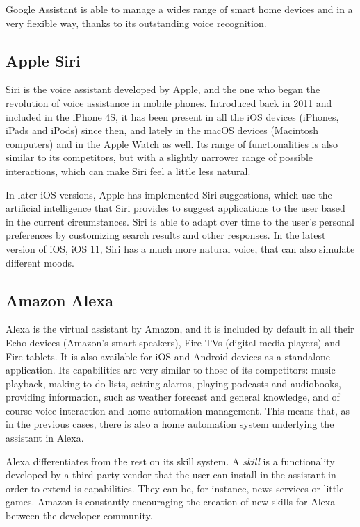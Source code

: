 Google Assistant is able to manage a wides range of smart home devices and in a very flexible way, thanks to its outstanding voice
recognition.

\subsection{Apple Siri}
Siri is the voice assistant developed by Apple, and the one who began the revolution of voice assistance in mobile phones. Introduced
back in 2011 and included in the iPhone 4S, it has been present in all the iOS devices (iPhones, iPads and iPods) since then, and lately
in the macOS devices (Macintosh computers) and in the Apple Watch as well.\cite{appleIOSSiri} Its range of functionalities is also
similar to its competitors, but with a slightly narrower range of possible interactions, which can make Siri feel a little less natural.

In later iOS versions, Apple has implemented Siri suggestions, which use the artificial intelligence that Siri provides to suggest
applications to the user based in the current circumstances. Siri is able to adapt over time to the user's personal preferences by
customizing search results and other responses. In the latest version of iOS, iOS 11, Siri has a much more natural voice, that can
also simulate different moods.

\subsection{Amazon Alexa}
Alexa is the virtual assistant by Amazon, and it is included by default in all their Echo devices (Amazon's smart speakers), Fire TVs
(digital media players) and Fire tablets. It is also available for iOS and Android devices as a standalone application. Its capabilities are
very similar to those of its competitors: music playback, making to-do lists, setting alarms, playing podcasts and audiobooks, providing
information, such as weather forecast and general knowledge, and of course voice interaction and home automation management.
This means that, as in the previous cases, there is also a home automation system underlying the assistant in Alexa.

Alexa differentiates from the rest on its skill system. A \textit{skill} is a functionality developed by a third-party vendor that the user
can install in the assistant in order to extend is capabilities. They can be, for instance, news services or little games. Amazon is
constantly encouraging the creation of new skills for Alexa between the developer community.\cite{amazonAlexa}

